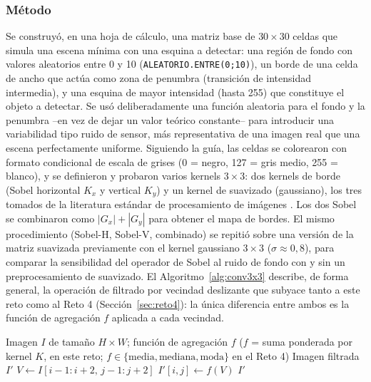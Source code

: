 \documentclass[11pt]{article}
\begin{document}
\subsubsection{Método}
Se construyó, en una hoja de cálculo, una matriz base de $30\times 30$
celdas que simula una escena mínima con una esquina a detectar: una región
de fondo con valores aleatorios entre 0 y 10 (\texttt{ALEATORIO.ENTRE(0;10)}),
un borde de una celda de ancho que actúa como zona de penumbra (transición
de intensidad intermedia), y una esquina de mayor intensidad (hasta 255)
que constituye el objeto a detectar. Se usó deliberadamente una función
aleatoria para el fondo y la penumbra --en vez de dejar un valor teórico
constante-- para introducir una variabilidad tipo ruido de sensor, más
representativa de una imagen real que una escena perfectamente uniforme.
Siguiendo la guía, las celdas se colorearon con formato condicional de
escala de grises (0 = negro, 127 = gris medio, 255 = blanco), y se
definieron y probaron varios kernels $3\times 3$: dos kernels de borde
(Sobel horizontal $K_x$ y vertical $K_y$) y un kernel de suavizado
(gaussiano), los tres tomados de la literatura estándar de procesamiento
de imágenes \citep{gonzalez2018digital}. Los dos Sobel se combinaron como
$|G_x|+|G_y|$ para obtener el mapa de bordes. El mismo procedimiento
(Sobel-H, Sobel-V, combinado) se repitió sobre una versión de la matriz
suavizada previamente con el kernel gaussiano $3\times 3$ ($\sigma\approx
0{,}8$), para comparar la sensibilidad del operador de Sobel al ruido de
fondo con y sin un preprocesamiento de suavizado. El Algoritmo~\ref{alg:conv3x3}
describe, de forma general, la operación de filtrado por vecindad
deslizante que subyace tanto a este reto como al Reto 4
(Sección~\ref{sec:reto4}): la única diferencia entre ambos es la función de
agregación $f$ aplicada a cada vecindad.

\begin{algorithm}
\caption{Filtrado por vecindad deslizante $3\times 3$}
\label{alg:conv3x3}
\begin{algorithmic}[1]
\Require Imagen $I$ de tamaño $H \times W$; función de agregación $f$
\Statex \hspace{1.5em} ($f$ = suma ponderada por kernel $K$, en este reto;
\Statex \hspace{1.5em} $f \in \{\text{media}, \text{mediana}, \text{moda}\}$ en el Reto 4)
\Ensure Imagen filtrada $I'$
        \State $V \gets I[i-1{:}i+2,\, j-1{:}j+2]$ 
        \State $I'[i,j] \gets f(V)$
    \EndFor
\EndFor
\State \Return $I'$
\end{algorithmic}
\end{algorithm}
\end{document}
